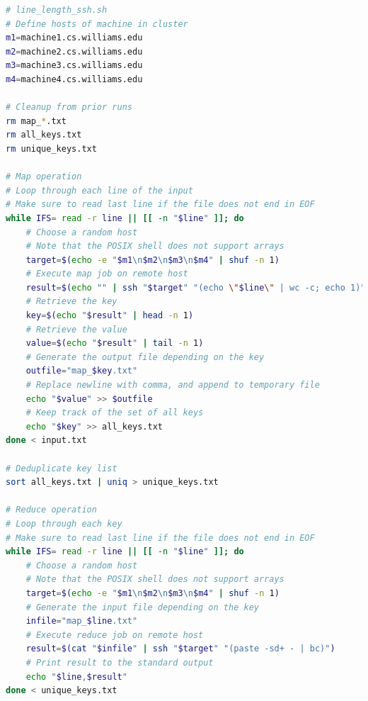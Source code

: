 \documentclass[twoside]{report}
\begin{document}
\begin{lstlisting}[language=sh]
# line_length_ssh.sh
# Define hosts of machine in cluster
m1=machine1.cs.williams.edu
m2=machine2.cs.williams.edu
m3=machine3.cs.williams.edu
m4=machine4.cs.williams.edu

# Cleanup from prior runs
rm map_*.txt
rm all_keys.txt
rm unique_keys.txt

# Map operation
# Loop through each line of the input
# Make sure to read last line if the file does not end in EOF
while IFS= read -r line || [[ -n "$line" ]]; do
    # Choose a random host
    # Note that the POSIX shell does not support arrays
    target=$(echo -e "$m1\n$m2\n$m3\n$m4" | shuf -n 1)
    # Execute map job on remote host
    result=$(echo "" | ssh "$target" "(echo \"$line\" | wc -c; echo 1)")
    # Retrieve the key
    key=$(echo "$result" | head -n 1)
    # Retrieve the value
    value=$(echo "$result" | tail -n 1)
    # Generate the output file depending on the key
    outfile="map_$key.txt"
    # Replace newline with comma, and append to temporary file
    echo "$value" >> $outfile
    # Keep track of the set of all keys
    echo "$key" >> all_keys.txt
done < input.txt

# Deduplicate key list
sort all_keys.txt | uniq > unique_keys.txt

# Reduce operation
# Loop through each key
# Make sure to read last line if the file does not end in EOF
while IFS= read -r line || [[ -n "$line" ]]; do
    # Choose a random host
    # Note that the POSIX shell does not support arrays
    target=$(echo -e "$m1\n$m2\n$m3\n$m4" | shuf -n 1)
    # Generate the input file depending on the key
    infile="map_$line.txt"
    # Execute reduce job on remote host
    result=$(cat "$infile" | ssh "$target" "(paste -sd+ - | bc)")
    # Print result to the standard output
    echo "$line,$result"
done < unique_keys.txt
\end{lstlisting}
\end{document}
